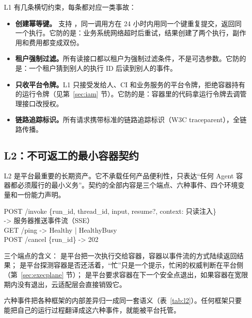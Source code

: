 L1 有几条横切约束，每条都对应一类事故：

\begin{itemize}
  \item \textbf{创建幂等键。} 支持 ，同一调用方在 24 小时内用同一个键重复提交，返回同一个执行。它防的是：业务系统网络超时后重试，结果创建了两个执行，副作用和费用都变成双份。
  \item \textbf{租户强制过滤。}所有读接口都以租户为强制过滤条件，不是可选参数。它防的是：一个租户猜到别人的执行 ID 后读到别人的事件。
  \item \textbf{只收平台令牌。}L1 只接受发给人、CI 和业务服务的平台令牌，拒绝容器持有的运行令牌（见第~\ref{sec:iam} 节）。它防的是：容器里的代码拿运行令牌去调管理接口改授权。
  \item \textbf{链路追踪标识。}所有请求携带标准的链路追踪标识（W3C traceparent），全链路传播。
\end{itemize}

\subsection{L2：不可返工的最小容器契约}

L2 是平台最重要的长期资产。它不承载任何产品便利性，只表达“任何 Agent 容器都必须履行的最小义务”。契约的全部内容是三个端点、六种事件、四个环境变量和一份能力声明。

\begin{codebox}
POST /invoke  \{run\_id, thread\_id, input, resume?, context: 只读注入\}\\
\hspace*{14ex}-> 服务器推送事件流（SSE）\\[0.4em]
GET  /ping    -> Healthy | HealthyBusy\\[0.4em]
POST /cancel  \{run\_id\} -> 202
\end{codebox}

三个端点的含义： 是平台把一次执行交给容器，容器以事件流的方式陆续返回结果； 是平台探测容器是否还活着，“忙”只是一个提示，忙闲的权威判断在平台侧（第~\ref{sec:execplane} 节）； 是平台要求容器在下一个安全点退出，如果容器在宽限期内没有退出，云适配层会直接销毁它。

六种事件把各种框架的内部差异归一成同一套语义（表~\ref{tab:l2}）。任何框架只要能把自己的运行过程翻译成这六种事件，就能被平台托管。

